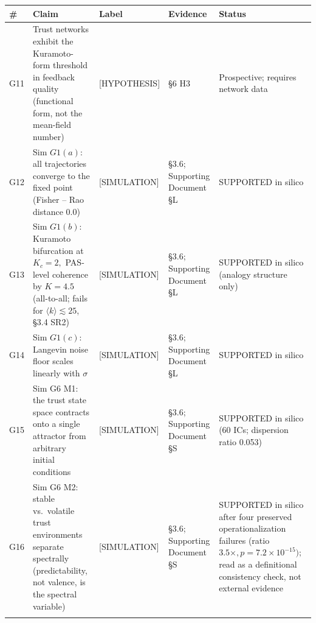 \documentclass[
]{article}
\newcounter{none} %
\begin{document}
{\def\LTcaptype{none} %
\begin{longtable}[]{@{}
  >{\raggedright\arraybackslash}p{}
  >{\raggedright\arraybackslash}p{}
  >{\raggedright\arraybackslash}p{}
  >{\raggedright\arraybackslash}p{}
  >{\raggedright\arraybackslash}p{}@{}}
\toprule\noalign{}
\begin{minipage}[b]{\linewidth}\raggedright
\textbf{\#}
\end{minipage} & \begin{minipage}[b]{\linewidth}\raggedright
\textbf{Claim}
\end{minipage} & \begin{minipage}[b]{\linewidth}\raggedright
\textbf{Label}
\end{minipage} & \begin{minipage}[b]{\linewidth}\raggedright
\textbf{Evidence}
\end{minipage} & \begin{minipage}[b]{\linewidth}\raggedright
\textbf{Status}
\end{minipage} \\
\midrule\noalign{}
\endhead
\bottomrule\noalign{}
\endlastfoot
G11 & Trust networks exhibit the Kuramoto-form threshold in feedback
quality (functional form, not the mean-field number) & {[}HYPOTHESIS{]}
& §6 H3 & Prospective; requires network data \\
G12 & Sim \(G1(a):\) all trajectories converge to the fixed point
(Fisher -- Rao distance 0.0) & {[}SIMULATION{]} & §3.6; Supporting
Document §L & SUPPORTED in silico \\
G13 & Sim \(G1(b):\) Kuramoto bifurcation at \(K_c = 2,\) PAS-level
coherence by \(K = 4.5\) (all-to-all; fails for
\(\langle k\rangle \lesssim 25\), §3.4 SR2) & {[}SIMULATION{]} & §3.6;
Supporting Document §L & SUPPORTED in silico (analogy structure only) \\
G14 & Sim \(G1(c):\) Langevin noise floor scales linearly with
\(\sigma\) & {[}SIMULATION{]} & §3.6; Supporting Document §L & SUPPORTED
in silico \\
G15 & Sim G6 M1: the trust state space contracts onto a single attractor
from arbitrary initial conditions & {[}SIMULATION{]} & §3.6; Supporting
Document §S & SUPPORTED in silico (60 ICs; dispersion ratio 0.053) \\
G16 & Sim G6 M2: stable vs.~volatile trust environments separate
spectrally (predictability, not valence, is the spectral variable) &
{[}SIMULATION{]} & §3.6; Supporting Document §S & SUPPORTED in silico
after four preserved operationalization failures (ratio
\(3.5\times, p = 7.2 \times 10^{-15});\) read as a definitional
consistency check, not external evidence \\
& & & & \\
\end{longtable}
}
\end{document}
